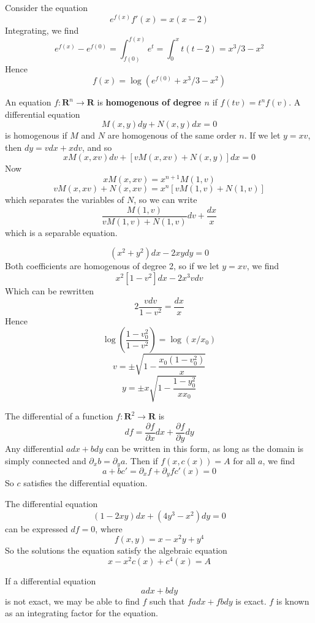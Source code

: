 \begin{example}
    Consider the equation
    \[ e^{f(x)} f'(x) = x (x-2) \]
    Integrating, we find
    \[ e^{f(x)} - e^{f(0)} = \int_{f(0)}^{f(x)} e^t = \int_0^x t(t-2) = x^3/3 - x^2 \]
    Hence
    \[ f(x) = \log(e^{f(0)} + x^3/3 - x^2) \]
\end{example}

An equation $f: \mathbf{R}^n \to \mathbf{R}$ is {\bf homogenous of degree $n$} if $f(tv) = t^n f(v)$. A differential equation
%
\[ M(x,y) dy + N(x,y) dx = 0 \]
%
is homogenous if $M$ and $N$ are homogenous of the same order $n$. If we let $y = xv$, then $dy = vdx + xdv$, and so
%
\[ x M(x,xv) dv + [v M(x,xv) + N(x,y)] dx = 0 \]
%
Now
%
\[ x M(x,xv) =  x^{n+1} M(1,v) \]
\[ v M(x,xv) + N(x,xv) = x^n[vM(1,v) + N(1,v)] \]
%
which separates the variables of $N$, so we can write
%
\[ \frac{M(1,v)}{vM(1,v) + N(1,v)} dv + \frac{dx}{x} \]
%
which is a separable equation.

\begin{example}
    \[ (x^2 + y^2) dx - 2xy dy = 0 \]
    Both coefficients are homogenous of degree 2, so if we let $y = xv$, we find
    \[ x^2[1 - v^2] dx - 2x^3v dv \]
    Which can be rewritten
    \[ 2 \frac{v dv}{1-v^2} = \frac{dx}{x} \]
    Hence
    \[ \log\left( \frac{1-v_0^2}{1 - v^2} \right) = \log(x/x_0) \]
    \[ v = \pm \sqrt{ 1 - \frac{x_0 (1 - v_0^2)}{x} } \]
    \[ y = \pm x \sqrt{ 1 - \frac{1 - y_0^2}{x x_0} } \]
\end{example}

The differential of a function $f: \mathbf{R}^2 \to \mathbf{R}$ is
%
\[ df = \frac{\partial f}{\partial x} dx + \frac{\partial f}{\partial y} dy \]
%
Any differential $a dx + b dy$ can be written in this form, as long as the domain is simply connected and $\partial_x b = \partial_y a$. Then if $f(x,c(x)) = A$ for all $a$, we find
%
\[ a + b c' = \partial_x f + \partial_y f c'(x) = 0 \]
%
So $c$ satisfies the differential equation.

\begin{example}
    The differential equation
    \[ (1 - 2xy) dx + (4y^3 - x^2) dy = 0 \]
    can be expressed $df = 0$, where
    \[ f(x,y) = x - x^2y + y^4 \]
    So the solutions the equation satisfy the algebraic equation
    \[ x - x^2 c(x) + c^4(x) = A \]
\end{example}

If a differential equation
%
\[ a dx + b dy \]
%
is not exact, we may be able to find $f$ such that $f a dx + f b dy$ is exact. $f$ is known as an integrating factor for the equation.

